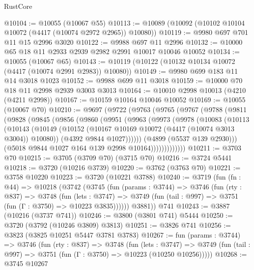 \begin{lexlean}{RustCore}
\begin{coremodule}
@10104 := @10055 (@10067 @55)
@10113 := @10089 (@10092 (@10102 @10104 @10072 (@4417 (@10074 @2972 @2965)) @10080))
@10119 := @9980 @697 @701 @11 @15 @2996 @3020
@10122 := @9988 @697 @11 @2996
@10132 := @10000 @65 @18 @11 @2933 @2939 @2982 @2991 @10017 @10046 @10052
@10134 := @10055 (@10067 @65)
@10143 := @10119 (@10122 (@10132 @10134 @10072 (@4417 (@10074 @2991 @2983)) @10080))
@10149 := @9980 @699 @183 @11 @14 @3018 @1023
@10152 := @9988 @699 @11 @3018
@10159 := @10000 @70 @18 @11 @2998 @2939 @3003 @3013
@10164 := @10010 @2998 @10013 (@4210 (@4211 @2998))
@10167 := @10159 @10164 @10046 @10052
@10169 := @10055 (@10067 @70)
@10210 := @9697
    (@9722
      (@9763
        (@9765
          (@9767
            (@9788
              (@9811
                (@9828
                  (@9845
                    (@9856
                      (@9860
                        (@9951
                          (@9963
                            (@9973
                              (@9978
                                (@10083
                                  (@10113
                                    (@10143
                                      (@10149
                                        (@10152
                                          (@10167
                                            @10169
                                            @10072
                                            (@4417 (@10074 @3013 @3004))
                                            @10080))
                                        (@4392 @9844 @1027))))))
                              (@4899 (@5537 @139 @2930)))
                            (@5018 @9844 @1027 @164 @139 @2998 @10164)))))))))))))
@10211 := @3703 @70
@10215 := @3705 (@3709 @70) (@3715 @70)
@10216 := @3724 @5441
@10218 := @3720 (@10216 @3739)
@10220 := @3762 (@3763 @70)
@10221 := @3758 @10220
@10223 := @3720 (@10221 @3788)
@10240 := @3719
    (fun (fn : @44) =>
    @10218
      (@3742
        (@3745
          (fun (params : @3744) =>
          @3746
            (fun (rty : @837) =>
            @3748
              (fun (lets : @3747) =>
              @3749 (fun (tail : @997) => @3751 (fun (Γ : @3750) => @10223 @3835))))))
        @3881))
    @741
@10243 := @3887 (@10216 (@3737 @741))
@10246 := @3800 (@3801 @741) @5444
@10250 := @3720 (@3792 (@10246 @3809) @3813)
@10251 := @3826 @741
@10256 := @3823 (@3825 @10251 @5447 @3781 @3783)
@10267 := fun (params : @3744) =>
  @3746
    (fun (rty : @837) =>
    @3748
      (fun (lets : @3747) =>
      @3749 (fun (tail : @997) => @3751 (fun (Γ : @3750) => @10223 (@10250 @10256)))))
@10268 := @3745 @10267

\end{coremodule}
\end{lexlean}
